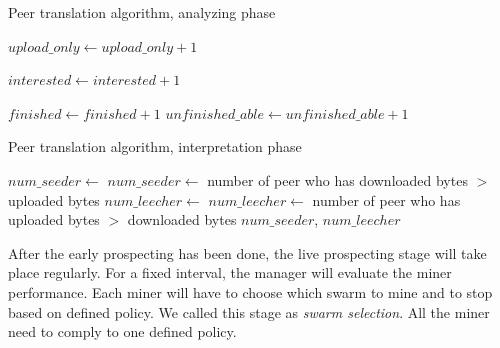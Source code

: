\begin{algorithm}[]
	\caption{Peer translation algorithm, analyzing phase}
	\label{alg:peertrans1}
	\begin{algorithmic}[1]
		\Statex
			\State $upload\_only \gets upload\_only + 1$
			\EndIf	
			
			\State $interested \gets interested + 1$
			\EndIf	
			
			\State $finished \gets finished + 1$
			\Else
			\State $unfinished\_able \gets unfinished\_able + 1$
			\EndIf	
			\EndIf
		\EndFor
	\end{algorithmic}
\end{algorithm}

\begin{algorithm}[]
	\caption{Peer translation algorithm, interpretation phase}
	\label{alg:peertrans2}
	\begin{algorithmic}[1]
		\State $num\_seeder \gets $ 
		\State $num\_seeder \gets $ number of peer who has downloaded bytes $>$ uploaded bytes
		\EndIf
		\State $num\_leecher \gets $ 
		\State $num\_leecher \gets $ number of peer who has uploaded bytes $>$ downloaded bytes
		\EndIf
		\State \Return $num\_seeder$, $num\_leecher$
	\EndFunction
	\end{algorithmic}
\end{algorithm}

After the early prospecting has been done, the live prospecting stage will take place regularly. For a fixed interval, the manager will evaluate the miner performance. Each miner will have to choose which swarm to mine and to stop based on defined policy. We called this stage as \textit{swarm selection}. All the miner need to comply to one defined policy. 

